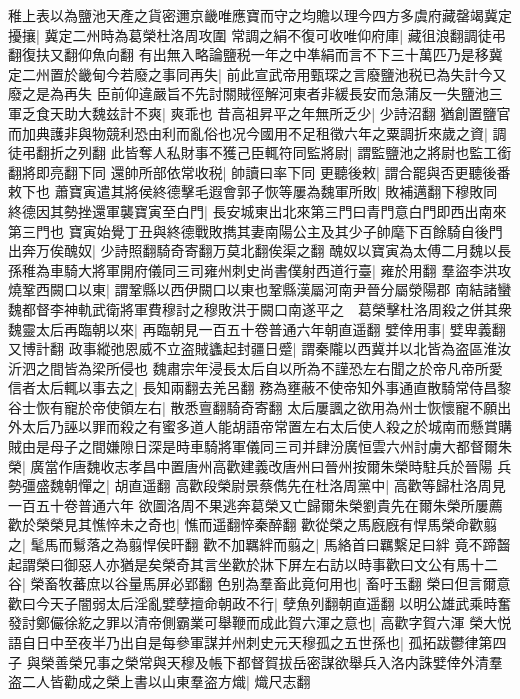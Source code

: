 稚上表以為鹽池天產之貨密邇京畿唯應寶而守之均贍以理今四方多虞府藏罄竭冀定擾攘|{
	冀定二州時為葛榮杜洛周攻圍}
常調之絹不復可收唯仰府庫|{
	藏徂浪翻調徒弔翻復扶又翻仰魚向翻}
有出無入略論鹽税一年之中凖絹而言不下三十萬匹乃是移冀定二州置於畿甸今若廢之事同再失|{
	前此宣武帝用甄琛之言廢鹽池税已為失計今又廢之是為再失}
臣前仰違嚴旨不先討關賊徑解河東者非緩長安而急蒲反一失鹽池三軍乏食天助大魏兹計不爽|{
	爽乖也}
昔高祖昇平之年無所乏少|{
	少詩沼翻}
猶創置鹽官而加典護非與物競利恐由利而亂俗也况今國用不足租徵六年之粟調折來歲之資|{
	調徒弔翻折之列翻}
此皆奪人私財事不獲己臣輒符同監將尉|{
	謂監鹽池之將尉也監工銜翻將即亮翻下同}
還帥所部依常收税|{
	帥讀曰率下同}
更聽後敕|{
	謂合罷與否更聽後番敕下也}
蕭寶寅遣其將侯終德擊毛遐會郭子恢等屢為魏軍所敗|{
	敗補邁翻下穆敗同}
終德因其勢挫還軍襲寶寅至白門|{
	長安城東出北來第三門曰青門意白門即西出南來第三門也}
寶寅始覺丁丑與終德戰敗擕其妻南陽公主及其少子帥麾下百餘騎自後門出奔万俟醜奴|{
	少詩照翻騎奇寄翻万莫北翻俟渠之翻}
醜奴以寶寅為太傅二月魏以長孫稚為車騎大將軍開府儀同三司雍州刺史尚書僕射西道行臺|{
	雍於用翻}
羣盜李洪攻燒鞏西闕口以東|{
	謂鞏縣以西伊闕口以東也鞏縣漢屬河南尹晉分屬滎陽郡}
南結諸蠻魏都督李神軌武衛將軍費穆討之穆敗洪于闕口南遂平之　葛榮擊杜洛周殺之併其衆　魏靈太后再臨朝以來|{
	再臨朝見一百五十卷普通六年朝直遥翻}
嬖倖用事|{
	嬖卑義翻又博計翻}
政事縱弛恩威不立盗賊蠭起封疆日蹙|{
	謂秦隴以西冀并以北皆為盗區淮汝沂泗之間皆為梁所侵也}
魏肅宗年浸長太后自以所為不謹恐左右聞之於帝凡帝所愛信者太后輒以事去之|{
	長知兩翻去羌呂翻}
務為壅蔽不使帝知外事通直散騎常侍昌黎谷士恢有寵於帝使領左右|{
	散悉亶翻騎奇寄翻}
太后屢諷之欲用為州士恢懷寵不願出外太后乃誣以罪而殺之有蜜多道人能胡語帝常置左右太后使人殺之於城南而懸賞購賊由是母子之間嫌隙日深是時車騎將軍儀同三司并肆汾廣恒雲六州討虜大都督爾朱榮|{
	廣當作唐魏收志孝昌中置唐州高歡建義改唐州曰晉州按爾朱榮時駐兵於晉陽}
兵勢彊盛魏朝憚之|{
	胡直遥翻}
高歡段榮尉景蔡儁先在杜洛周黨中|{
	高歡等歸杜洛周見一百五十卷普通六年}
欲圖洛周不果逃奔葛榮又亡歸爾朱榮劉貴先在爾朱榮所屢薦歡於榮榮見其憔悴未之奇也|{
	憔而遥翻悴秦醉翻}
歡從榮之馬廐廐有悍馬榮命歡翦之|{
	髦馬而鬄落之為翦悍侯旰翻}
歡不加羈絆而翦之|{
	馬絡首曰羈繫足曰絆}
竟不蹄齧起謂榮曰御惡人亦猶是矣榮奇其言坐歡於牀下屏左右訪以時事歡曰文公有馬十二谷|{
	榮畜牧蕃庶以谷量馬屏必郢翻}
色别為羣畜此竟何用也|{
	畜吁玉翻}
榮曰但言爾意歡曰今天子闇弱太后淫亂嬖孽擅命朝政不行|{
	孽魚列翻朝直遥翻}
以明公雄武乘時奮發討鄭儼徐紇之罪以清帝側霸業可舉鞭而成此賀六渾之意也|{
	高歡字賀六渾}
榮大悦語自日中至夜半乃出自是每參軍謀并州刺史元天穆孤之五世孫也|{
	孤拓跋鬱律第四子}
與榮善榮兄事之榮常與天穆及帳下都督賀拔岳密謀欲舉兵入洛内誅嬖倖外清羣盗二人皆勸成之榮上書以山東羣盗方熾|{
	熾尺志翻}
